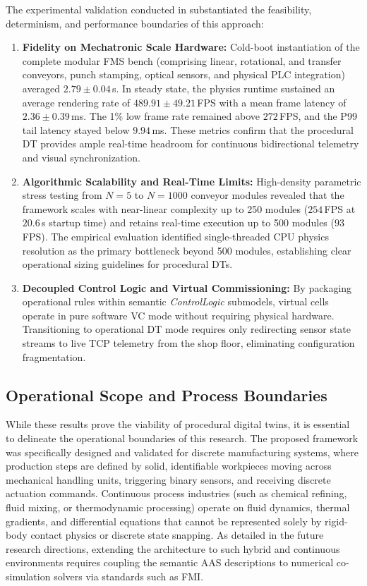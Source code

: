 The experimental validation conducted in  substantiated the feasibility, determinism, and performance boundaries of this approach:
\begin{enumerate}
    \item \textbf{Fidelity on Mechatronic Scale Hardware:} Cold-boot instantiation of the complete modular \gls{FMS} bench (comprising linear, rotational, and transfer conveyors, punch stamping, optical sensors, and physical \gls{PLC} integration) averaged $2.79 \pm 0.04\,$s. In steady state, the physics runtime sustained an average rendering rate of $489.91 \pm 49.21\,$\gls{FPS} with a mean frame latency of $2.36 \pm 0.39\,$ms. The 1\% low frame rate remained above $272\,$\gls{FPS}, and the P99 tail latency stayed below $9.94\,$ms. These metrics confirm that the procedural \gls{DT} provides ample real-time headroom for continuous bidirectional telemetry and visual synchronization.
    \item \textbf{Algorithmic Scalability and Real-Time Limits:} High-density parametric stress testing from $N=5$ to $N=1000$ conveyor modules revealed that the framework scales with near-linear complexity up to 250 modules ($254\,$\gls{FPS} at $20.6\,$s startup time) and retains real-time execution up to 500 modules ($93\,$\gls{FPS}). The empirical evaluation identified single-threaded \gls{CPU} physics resolution as the primary bottleneck beyond 500 modules, establishing clear operational sizing guidelines for procedural \glspl{DT}.
    \item \textbf{Decoupled Control Logic and Virtual Commissioning:} By packaging operational rules within semantic \textit{ControlLogic} submodels, virtual cells operate in pure software \gls{VC} mode without requiring physical hardware. Transitioning to operational \gls{DT} mode requires only redirecting sensor state streams to live \gls{TCP} telemetry from the shop floor, eliminating configuration fragmentation.
\end{enumerate}

\subsection{Operational Scope and Process Boundaries}

While these results prove the viability of procedural digital twins, it is essential to delineate the operational boundaries of this research. The proposed framework was specifically designed and validated for discrete manufacturing systems, where production steps are defined by solid, identifiable workpieces moving across mechanical handling units, triggering binary sensors, and receiving discrete actuation commands. Continuous process industries (such as chemical refining, fluid mixing, or thermodynamic processing) operate on fluid dynamics, thermal gradients, and differential equations that cannot be represented solely by rigid-body contact physics or discrete state snapping. As detailed in the future research directions, extending the architecture to such hybrid and continuous environments requires coupling the semantic \gls{AAS} descriptions to numerical co-simulation solvers via standards such as \gls{FMI}.

